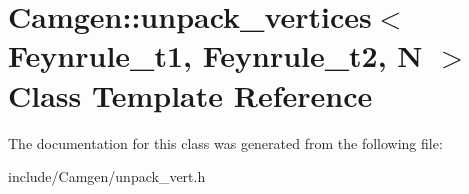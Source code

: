 \hypertarget{a00573}{}\section{Camgen\+:\+:unpack\+\_\+vertices$<$ Feynrule\+\_\+t1, Feynrule\+\_\+t2, N $>$ Class Template Reference}
\label{a00573}


The documentation for this class was generated from the following file\+:\begin{DoxyCompactItemize}
\item 
include/\+Camgen/unpack\+\_\+vert.\+h\end{DoxyCompactItemize}
